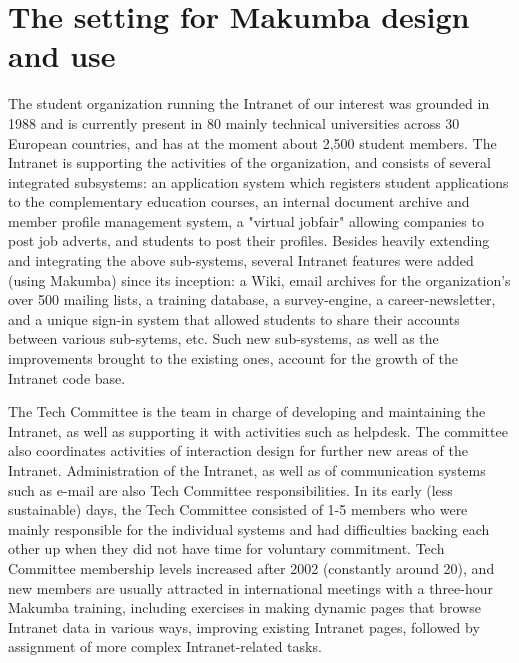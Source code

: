 \documentclass{llncs}
\begin{document}
\section{The setting for Makumba design and use}\label{sec:setting}
The student organization running the Intranet of our interest was grounded in 1988 and is currently present in 80 mainly technical universities across 30 European countries, and has at the moment about 2,500 student members. The Intranet is supporting the activities of the organization, and consists of several integrated subsystems: an application system which registers student applications to the complementary education courses, an internal document archive and member profile management system, a "virtual jobfair" allowing companies to post job adverts, and students to post their profiles. Besides heavily extending and integrating the above sub-systems, several Intranet features were added (using Makumba) since its inception: a Wiki, email archives for the organization's over 500 mailing lists, a training database, a survey-engine, a career-newsletter, and a unique sign-in system that allowed students to share their accounts between various sub-sytems, etc. Such new sub-systems, as well as the improvements brought to the existing ones, account for the growth of the Intranet code base.

The Tech Committee is the team in charge of developing and maintaining the Intranet, as well as supporting it with activities such as helpdesk. The committee also coordinates activities of interaction design for further new areas of the Intranet. Administration of the Intranet, as well as of communication systems such as e-mail are also Tech Committee responsibilities. In its early (less sustainable) days, the Tech Committee consisted of 1-5 members who were mainly responsible for the individual systems and had difficulties backing each other up when they did not have time for voluntary commitment. Tech Committee membership levels increased after 2002 (constantly around 20), and new members are usually attracted in international meetings with a three-hour Makumba training, including exercises in making dynamic pages that browse Intranet data in various ways, improving existing Intranet pages, followed by assignment of more complex Intranet-related tasks.


\end{document}

